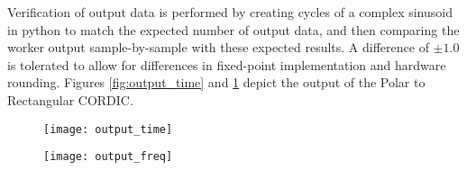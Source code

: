 \documentclass{article}
\begin{document}
\begin{flushleft}
	Verification of output data is performed by creating cycles of a complex sinusoid in python to match the expected number of output data, and then comparing the worker output sample-by-sample with these expected results. A difference of $\pm1.0$ is tolerated to allow for differences in fixed-point implementation and hardware rounding. Figures \ref{fig:output_time} and \ref{fig:output_freq} depict the output of the Polar to Rectangular CORDIC.
\end{flushleft}

	\begin{figure}[ht]
		\centering
		\begin{minipage}{.5\textwidth}
			\centering\texttt{[image: output\_time]}
			\label{fig:output_time}
		\end{minipage}%
		\begin{minipage}{.5\textwidth}
			\centering\texttt{[image: output\_freq]}
			\label{fig:output_freq}
		\end{minipage}
	\end{figure}
\end{document}
